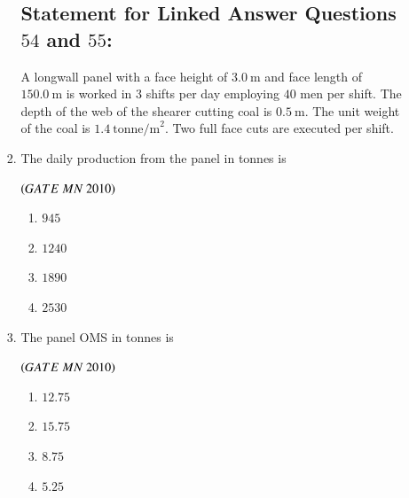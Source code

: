 \documentclass{article}
\begin{document}
\begin{enumerate}[label=Q.\arabic*., itemsep=1em, leftmargin=0pt, itemindent=*, labelsep=0.5em]
\begin{enumerate}[label=Q.\arabic*., start=17, leftmargin=2em]
\begin{enumerate}[label=Q.\arabic*., start=33, leftmargin=2em]
\subsection*{Statement for Linked Answer Questions $54$ and $55$:}
A longwall panel with a face height of $3.0\ \text{m}$ and face length of $150.0\ \text{m}$ is worked in $3$ shifts per day employing $40$ men per shift. The depth of the web of the shearer cutting coal is $0.5\ \text{m}$. The unit weight of the coal is $1.4\ \text{tonne/m}^2$. Two full face cuts are executed per shift.
\item  The daily production from the panel in tonnes is
\\
\begin{flushright}
\hfill$\left(GATE\ MN\ 2010\right)$
\end{flushright}
\begin{multicols}{4}
\begin{enumerate}[label=(\Alph*),leftmargin=4em]
\item $945$
\item $1240$
\item $1890$
\item $2530$
\end{enumerate}
\end{multicols}
\bigskip
\item The panel OMS in tonnes is
\\
\begin{flushright}
\hfill$\left(GATE\ MN\ 2010\right)$
\end{flushright}
\begin{multicols}{4}
\begin{enumerate}[label=(\Alph*),leftmargin=4em]
\item $12.75$
\item $15.75$
\item $8.75$
\item $5.25$
\end{enumerate}
\end{multicols}
\bigskip

\end{enumerate}
\end{enumerate}
\end{enumerate}
\end{document}
